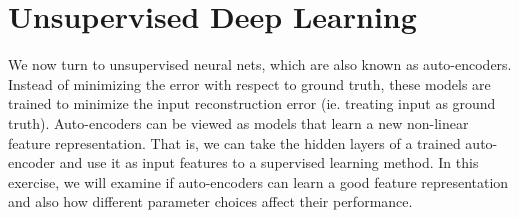 \documentclass[english]{article}
\begin{document}
\section{Unsupervised Deep Learning }
\label{sec:udl}

We now turn to unsupervised neural nets, which are also known as auto-encoders. Instead of minimizing the error with respect to ground truth, these models are trained to minimize the input reconstruction error (ie. treating input as ground truth). Auto-encoders can be viewed as models that learn a new non-linear feature representation. That is, we can take the hidden layers of a trained auto-encoder and use it as input features to a supervised learning method. In this exercise, we will examine if auto-encoders can learn a good feature representation and also how different parameter choices affect their performance.
\end{document}
